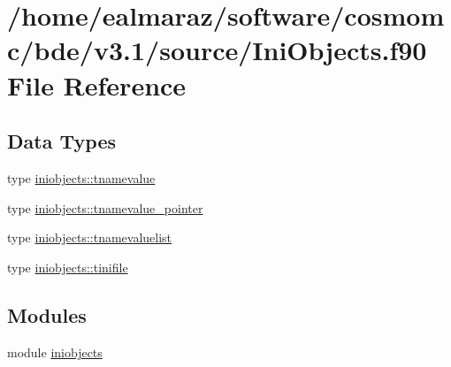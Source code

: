 \hypertarget{IniObjects_8f90}{}\section{/home/ealmaraz/software/cosmomc/bde/v3.1/source/\+Ini\+Objects.f90 File Reference}
\label{IniObjects_8f90}
\subsection*{Data Types}
\begin{DoxyCompactItemize}
\item 
type \mbox{\hyperlink{structiniobjects_1_1tnamevalue}{iniobjects\+::tnamevalue}}
\item 
type \mbox{\hyperlink{structiniobjects_1_1tnamevalue__pointer}{iniobjects\+::tnamevalue\+\_\+pointer}}
\item 
type \mbox{\hyperlink{structiniobjects_1_1tnamevaluelist}{iniobjects\+::tnamevaluelist}}
\item 
type \mbox{\hyperlink{structiniobjects_1_1tinifile}{iniobjects\+::tinifile}}
\end{DoxyCompactItemize}
\subsection*{Modules}
\begin{DoxyCompactItemize}
\item 
module \mbox{\hyperlink{namespaceiniobjects}{iniobjects}}
\end{DoxyCompactItemize}
